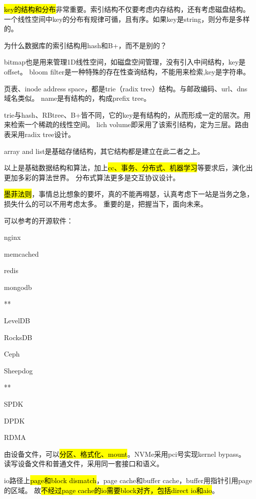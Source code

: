 \hl{key的结构和分布}非常重要。索引结构不仅要考虑内存结构，还有考虑磁盘结构。
一个线性空间中key的分布有规律可循，且有序。如果key是string，则分布是多样的。

为什么数据库的索引结构用hash和B+，而不是别的？

\hrulefill

bitmap也是用来管理1D线性空间，如磁盘空间管理，没有引入中间结构，key是offset。
bloom filter是一种特殊的存在性查询结构，不能用来检索,key是字符串。

页表、inode address space，都是trie（radix tree）结构。与邮政编码、url、dns域名类似。
name是有结构的，构成prefix tree。

trie与hash、RBtree、B+皆不同，它的key是有结构的，从而形成一定的层次。用来检索一个稀疏的线性空间。
lich volume即采用了该索引结构，定为三层。路由表采用radix tree设计。

array and list是基础存储结构，其它结构都是建立在此二者之上。

\hrulefill

以上是基础数据结构和算法，加上\hl{cc、事务、分布式、机器学习}等要求后，演化出更加多彩的算法世界。
分布式算法更多是交互协议设计。

\hl{墨菲法则}，事情总比想象的要坏，真的不能再嘚瑟，认真考虑下一站是当务之急，损失什么的可以不用考虑太多。
重要的是，把握当下，面向未来。

可以参考的开源软件：
\begin{enumbox}
\item nginx
\item memcached
\item redis
\item mongodb
\item ***
\item LevelDB
\item RocksDB
\item Ceph
\item Sheepdog
\item ***
\item SPDK
\item DPDK
\item RDMA
\end{enumbox}

\hrulefill

由设备文件，可以\hl{分区、格式化、mount}。NVMe采用pci号实现kernel bypass。
读写设备文件和普通文件，采用同一套接口和语义。

io路径上\hl{page和block dismatch}，page cache和buffer cache，buffer用指针引用page的区域。
故\hl{不经过page cache的io需要block对齐，包括direct io和aio}。

